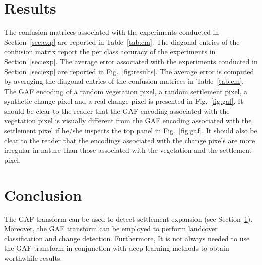 \documentclass{article}
\begin{document}
\section{Results}
\label{sec:results}
The confusion matrices associated with the experiments conducted in Section~\ref{sec:exp} are reported in Table~\ref{tab:cm}. The diagonal entries of the confusion matrix report the per class accuracy of the experiments in Section~\ref{sec:exp}. The average error associated with the experiments conducted in Section~\ref{sec:exp} are reported in Fig.~\ref{fig:results}. The average error is computed by averaging the diagonal entries of the confusion matrices in Table~\ref{tab:cm}. The GAF encoding of a random vegetation pixel, a random settlement pixel, a synthetic change pixel and a real change pixel is presented in Fig.~\ref{fig:gaf}. It should be clear to the reader that the GAF encoding associated with the vegetation pixel is visually different from the GAF encoding associated with the settlement pixel if he/she inspects the top panel in Fig.~\ref{fig:gaf}. It should also be clear to the reader that the encodings associated with the change pixels are more irregular in nature than those associated with the vegetation and the settlement pixel.   

\section{Conclusion}
The GAF transform can be used to detect settlement expansion (see Section~\ref{sec:results}). Moreover, the GAF transform can be employed to perform landcover classification and change detection. Furthermore, It is not always needed to use the GAF transform in conjunction with deep learning methods to obtain worthwhile results.  
\end{document}
